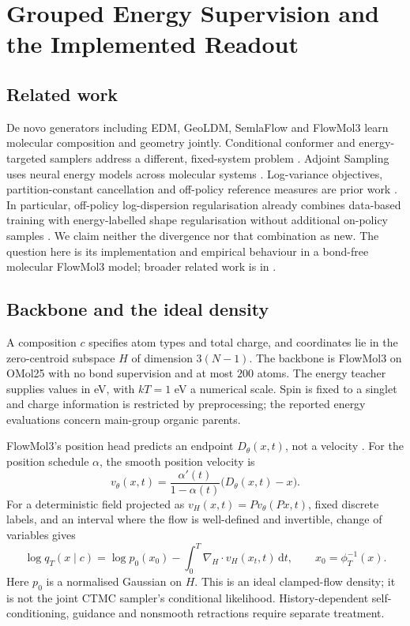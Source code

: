 \section{Grouped Energy Supervision and the Implemented Readout}
\label{sec:method}

\subsection{Related work}
\label{sec:related}
De novo generators including EDM, GeoLDM, SemlaFlow and FlowMol3
\citep{edm,geoldm,semlaflow,flowmol3} learn molecular composition and geometry jointly. Conditional
conformer and energy-targeted samplers address a different, fixed-system problem
\citep{torsionaldiff,noe2019boltzmann,fab,adjointsampling,idem,ewfm}.
Adjoint Sampling uses neural energy models across molecular systems
\citep{adjointsampling}. Log-variance objectives, partition-constant cancellation and off-policy
reference measures are prior work \citep{vargrad,nusken2021pathspace,richter2024improvedsampling,sendera2024offpolicy}.
In particular, off-policy log-dispersion regularisation already combines data-based training with
energy-labelled shape regularisation without additional on-policy samples \citep{ldr2026}.
We claim neither the divergence nor that combination as new. The question here is its implementation
and empirical behaviour in a bond-free molecular FlowMol3 model; broader related work is in
.

\subsection{Backbone and the ideal density}
\label{sec:method:flow}
A composition $c$ specifies atom types and total charge, and coordinates lie in the zero-centroid
subspace $H$ of dimension $3(N-1)$. The backbone is FlowMol3 on OMol25 with no bond supervision
and at most $200$ atoms. The energy teacher supplies values in eV, with $kT=1$ eV a numerical
scale. Spin is fixed to a singlet and charge information is restricted by preprocessing; the
reported energy evaluations concern main-group organic parents.

FlowMol3's position head predicts an endpoint $D_\theta(x,t)$, not a velocity
\citep{flowmol3}. For the position schedule $\alpha$, the smooth position velocity is
\begin{equation}
 v_\theta(x,t)=\frac{\alpha'(t)}{1-\alpha(t)}\bigl(D_\theta(x,t)-x\bigr).
 \label{eq:headvelocity}
\end{equation}
For a deterministic field projected as $v_H(x,t)=P v_\theta(Px,t)$, fixed discrete labels, and an
interval where the flow is well-defined and invertible, change of variables gives
\begin{equation}
 \log q_T(x\mid c)=\log p_0(x_0)-\int_0^T\nabla_H\!\cdot v_H(x_t,t)\,\mathrm{d}t,
 \qquad x_0=\phi_T^{-1}(x).
 \label{eq:ffjord}
\end{equation}
Here $p_0$ is a normalised Gaussian on $H$. This is an ideal clamped-flow density; it is not the
joint CTMC sampler's conditional likelihood. History-dependent self-conditioning, guidance and
nonsmooth retractions require separate treatment.

